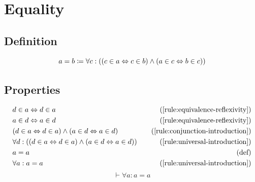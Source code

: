 \section{Equality}
\label{sec:equality}


\subsection{Definition}
\newcommand{\noreq}[3]{\norforall{#3}{\norwedge{\norlequiv{\norin{#3}{#1}}{\norin{#3}{#2}}}{\norlequiv{\norin{#1}{#3}}{\norin{#2}{#3}}}}} %
\begin{notation}
    \[a = b \coloneqq \forall c: ((c \in a \Leftrightarrow c \in b) \wedge (a \in c \Leftrightarrow b \in c))\]
\end{notation}

\subsection{Properties}
\begin{align*}
    & \hspace{0em} d \in a \Leftrightarrow d \in a & \quad (\text{\ref{rule:equivalence-reflexivity}})\\
    & \hspace{0em} a \in d \Leftrightarrow a \in d & \quad (\text{\ref{rule:equivalence-reflexivity}})\\
    & \hspace{0em} (d \in a \Leftrightarrow d \in a)
        \wedge (a \in d \Leftrightarrow a \in d) & \quad (\text{\ref{rule:conjunction-introduction}})\\
    & \hspace{0em} \forall d: ((d \in a \Leftrightarrow d \in a)
        \wedge (a \in d \Leftrightarrow a \in d)) & \quad (\text{\ref{rule:universal-introduction}})\\
    & \hspace{0em} a = a & \quad (\text{def})\\
    & \hspace{0em} \forall a: a = a & \quad (\text{\ref{rule:universal-introduction}})
\end{align*}
\begin{equation}
    \vdash \forall a: a = a
    \label{rule:equality-reflexivity}
\end{equation}

